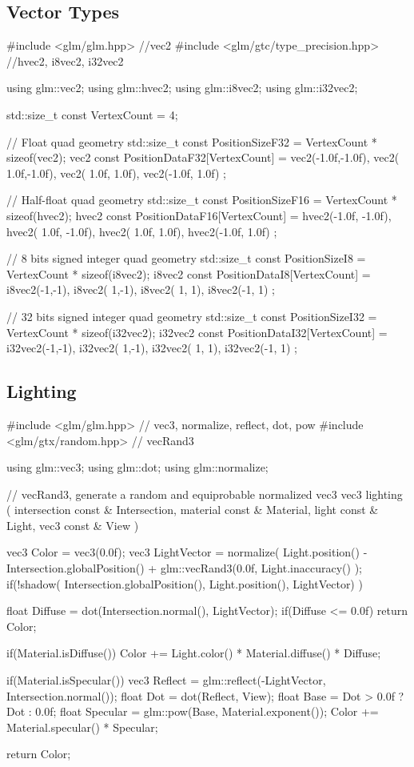 \documentclass{scrartcl}
\numberwithin{figure}{subsection}
\begin{document}
\subsection{Vector Types}

\begin{cppcode}
#include <glm/glm.hpp> //vec2
#include <glm/gtc/type_precision.hpp> //hvec2, i8vec2, i32vec2

using glm::vec2;
using glm::hvec2;
using glm::i8vec2;
using glm::i32vec2;

std::size_t const VertexCount = 4;

// Float quad geometry
std::size_t const PositionSizeF32 = VertexCount * sizeof(vec2);
vec2 const PositionDataF32[VertexCount] =
{
  vec2(-1.0f,-1.0f),
  vec2( 1.0f,-1.0f),
  vec2( 1.0f, 1.0f),
  vec2(-1.0f, 1.0f)
};

// Half-float quad geometry
std::size_t const PositionSizeF16 = VertexCount * sizeof(hvec2);
hvec2 const PositionDataF16[VertexCount] =
{
  hvec2(-1.0f, -1.0f),
  hvec2( 1.0f, -1.0f),
  hvec2( 1.0f, 1.0f),
  hvec2(-1.0f, 1.0f)
};

// 8 bits signed integer quad geometry
std::size_t const PositionSizeI8 = VertexCount * sizeof(i8vec2);
i8vec2 const PositionDataI8[VertexCount] =
{
  i8vec2(-1,-1),
  i8vec2( 1,-1),
  i8vec2( 1, 1),
  i8vec2(-1, 1)
};

// 32 bits signed integer quad geometry
std::size_t const PositionSizeI32 = VertexCount * sizeof(i32vec2);
i32vec2 const PositionDataI32[VertexCount] =
{
  i32vec2(-1,-1),
  i32vec2( 1,-1),
  i32vec2( 1, 1),
  i32vec2(-1, 1)
};
\end{cppcode}


\subsection{Lighting}

\begin{cppcode}
#include <glm/glm.hpp> // vec3, normalize, reflect, dot, pow
#include <glm/gtx/random.hpp> // vecRand3

using glm::vec3;
using glm::dot;
using glm::normalize;

// vecRand3, generate a random and equiprobable normalized vec3
vec3 lighting
(
  intersection const & Intersection,
  material const & Material,
  light const & Light,
  vec3 const & View
)
{
  vec3 Color = vec3(0.0f);
  vec3 LightVector = normalize(
    Light.position() - Intersection.globalPosition() +
    glm::vecRand3(0.0f, Light.inaccuracy()
  );
  if(!shadow(
    Intersection.globalPosition(), Light.position(), LightVector)
  )
  {
    float Diffuse = dot(Intersection.normal(), LightVector);
    if(Diffuse <= 0.0f)
      return Color;

    if(Material.isDiffuse())
      Color += Light.color() * Material.diffuse() * Diffuse;

    if(Material.isSpecular())
    {
      vec3 Reflect = glm::reflect(-LightVector, Intersection.normal());
      float Dot = dot(Reflect, View);
      float Base = Dot > 0.0f ? Dot : 0.0f;
      float Specular = glm::pow(Base, Material.exponent());
      Color += Material.specular() * Specular;
    }
  }
  return Color;
}
\end{cppcode}
\end{document}
